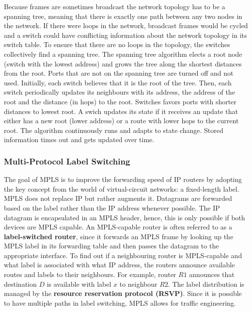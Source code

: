 Because frames are sometimes broadcast the network topology has to be a spanning tree, meaning that there is exactly one path between any two nodes in the network. If there were loops in the network, broadcast frames would be cycled and a switch could have conflicting information about the network topology in its switch table. To ensure that there are no loops in the topology, the switches collectively find a spanning tree. The spanning tree algorithm elects a root node (switch with the lowest address) and grows the tree along the shortest distances from the root. Ports that are not on the spanning tree are turned off and not used. Initially, each switch believes that it is the root of the tree. Then, each switch periodically updates its neighbours with its address, the address of the root and the distance (in hops) to the root. Switches favors ports with shorter distances to lowest root. A swich updates its state if it receives an update that either has a new root (lower address) or a route with lower hops to the current root. The algorithm continuously runs and adapts to state change. Stored information times out and gets updated over time.

\subsubsection{Multi-Protocol Label Switching}
The goal of MPLS is to improve the forwarding speed of IP routers by adopting the key concept from the world of virtual-circuit networks: a fixed-length label. MPLS does not replace IP but rather augments it. Datagrams are forwarded based on the label rather than the IP address whenever possible. The IP datagram is encapsulated in an MPLS header, hence, this is only possible if both devices are MPLS capable. An MPLS-capable router is often referred to as a \textbf{label-switched router}, since it forwards an MPLS frame by looking up the MPLS label in its forwarding table and then passes the datagram to the appropriate interface. To find out if a neighbouring router is MPLS-capable and what label is associated with what IP address, the routers announce available routes and labels to their neighbours. For example, router $R1$ announces that destination $D$ is available with label $x$ to neighbour $R2$. The label distribution is managed by the \textbf{resource reservation protocol (RSVP)}. Since it is possible to have multiple paths in label switching, MPLS allows for traffic engineering.

